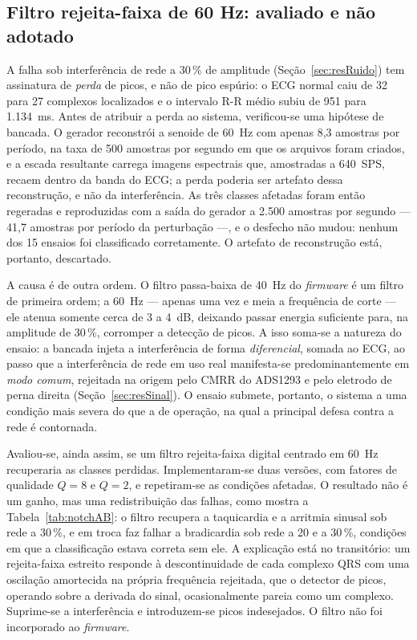 \subsection{Filtro rejeita-faixa de 60 Hz: avaliado e não adotado}
\label{sec:resNotch}

A falha sob interferência de rede a 30\,\% de amplitude
(Seção~\ref{sec:resRuido}) tem assinatura de \emph{perda} de picos, e não de pico espúrio: o
\acs{ECG} normal caiu de 32 para 27 complexos localizados e o intervalo R-R médio subiu de
951 para 1.134~ms. Antes de atribuir a perda ao sistema, verificou-se uma hipótese de
bancada. O gerador reconstrói a senoide de 60~Hz com apenas 8,3 amostras por período, na
taxa de 500 amostras por segundo em que os arquivos foram criados, e a escada resultante
carrega imagens espectrais que, amostradas a 640~SPS, recaem dentro da banda do \acs{ECG}; a
perda poderia ser artefato dessa reconstrução, e não da interferência. As três classes
afetadas foram então regeradas e reproduzidas com a saída do gerador a 2.500 amostras por
segundo --- 41,7 amostras por período da perturbação ---, e o desfecho não mudou: nenhum dos
15 ensaios foi classificado corretamente. O artefato de reconstrução está, portanto,
descartado.

A causa é de outra ordem. O filtro passa-baixa de 40~Hz do \textit{firmware} é um filtro de
primeira ordem; a 60~Hz --- apenas uma vez e meia a frequência de corte --- ele atenua
somente cerca de 3 a 4~dB, deixando passar energia suficiente para, na amplitude de 30\,\%,
corromper a detecção de picos. A isso soma-se a natureza do ensaio: a bancada injeta a
interferência de forma \emph{diferencial}, somada ao \acs{ECG}, ao passo que a interferência
de rede em uso real manifesta-se predominantemente em \emph{modo comum}, rejeitada na origem
pelo \acs{CMRR} do ADS1293 e pelo eletrodo de perna direita
(Seção~\ref{sec:resSinal}). O ensaio submete, portanto, o sistema a uma condição mais severa
do que a de operação, na qual a principal defesa contra a rede é contornada.

Avaliou-se, ainda assim, se um filtro rejeita-faixa digital centrado em 60~Hz recuperaria as
classes perdidas. Implementaram-se duas versões, com fatores de qualidade $Q=8$ e $Q=2$, e
repetiram-se as condições afetadas. O resultado não é um ganho, mas uma redistribuição das
falhas, como mostra a Tabela~\ref{tab:notchAB}: o filtro recupera a taquicardia e a arritmia
sinusal sob rede a 30\,\%, e em troca faz falhar a bradicardia sob rede a 20 e a 30\,\%,
condições em que a classificação estava correta sem ele. A explicação está no transitório:
um rejeita-faixa estreito responde à descontinuidade de cada complexo QRS com uma oscilação
amortecida na própria frequência rejeitada, que o detector de picos, operando sobre a
derivada do sinal, ocasionalmente pareia como um complexo. Suprime-se a interferência e
introduzem-se picos indesejados. O filtro não foi incorporado ao \textit{firmware}.

